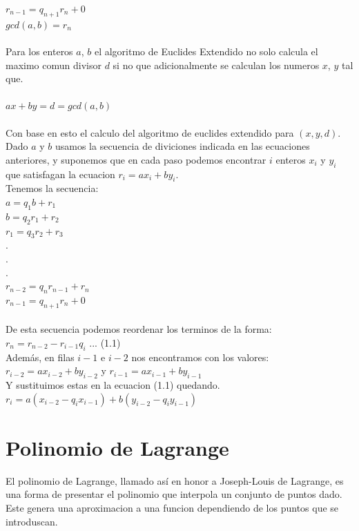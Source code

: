 \documentclass[12pt,oneside,onecolumn,openany]{report}
\begin{document}
$r_{n-1}=q_{n+1}r_n+0$\\
$gcd(a,b)=r_n$\\\\
Para los enteros $a$, $b$ el algoritmo de Euclides Extendido no solo calcula el maximo comun divisor $d$ si no que adicionalmente se calculan los numeros $x$, $y$ tal que.\\\\
$ax+by=d=gcd(a,b)$\\\\
Con base en esto el calculo del algoritmo de euclides extendido para $(x,y,d)$. Dado  $a$ y $b$ usamos la secuencia de diviciones indicada en las ecuaciones anteriores, y suponemos que en cada paso podemos encontrar $i$ enteros $x_i$ y $y_i$ que satisfagan la ecuacion $r_i=ax_i+by_i$.\\
Tenemos la secuencia:\\
$a=q_1b+r_1$\\
$b=q_2r_1+r_2$\\
$r_1=q_3r_2+r_3$\\
$.$\\
$.$\\
$.$\\
$r_{n-2}=q_nr_{n-1}+r_n$\\
$r_{n-1}=q_{n+1}r_n+0$\\\\
De esta secuencia podemos reordenar los terminos de la forma:\\
$r_n=r_{n-2}-r_{i-1}q_i$ ... (1.1)\\
Además, en filas $i-1$ e $i-2$ nos encontramos con los valores:\\
$r_{i-2}=ax_{i-2}+by_{i-2}$ y $r_{i-1}=ax_{i-1}+by_{i-1}$\\
Y sustituimos estas en la ecuacion (1.1) quedando.\\
$r_i=a(x_{i-2}-q_ix_{i-1})+b(y_{i-2}-q_iy_{i-1})$
\cite{modes}\\

\section{Polinomio de Lagrange}
 El polinomio de Lagrange, llamado así en honor a Joseph-Louis de Lagrange, es una forma de presentar el polinomio que interpola un conjunto de puntos dado. Este genera una aproximacion a una funcion dependiendo de los puntos que se introduscan.\cite{stin}\\\\
 
\end{document}
